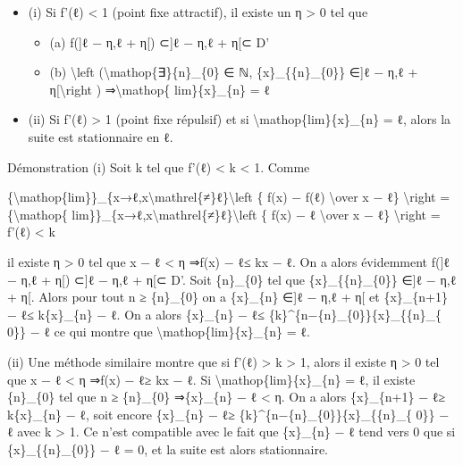 \documentclass[]{article}
\begin{document}
\begin{itemize}
\itemsep1pt\parskip0pt
\item
  (i) Si \textbar{}f'(ℓ)\textbar{} \textless{} 1 (point fixe attractif),
  il existe un η \textgreater{} 0 tel que

  \begin{itemize}
  \itemsep1pt\parskip0pt
  \item
    (a) f({]}ℓ − η,ℓ + η{[}) ⊂{]}ℓ − η,ℓ + η{[}⊂ D'
  \item
    (b) \textbackslash{}left (\textbackslash{}mathop\{∃\}\{n\}\_\{0\} ∈
    ℕ, \{x\}\_\{\{n\}\_\{0\}\} ∈{]}ℓ − η,ℓ + η{[}\textbackslash{}right )
    ⇒\textbackslash{}mathop\{ lim\}\{x\}\_\{n\} = ℓ
  \end{itemize}
\item
  (ii) Si \textbar{}f'(ℓ)\textbar{} \textgreater{} 1 (point fixe
  répulsif) et si \textbackslash{}mathop\{lim\}\{x\}\_\{n\} = ℓ, alors
  la suite est stationnaire en ℓ.
\end{itemize}

Démonstration (i) Soit k tel que \textbar{}f'(ℓ)\textbar{} \textless{} k
\textless{} 1. Comme

\{\textbackslash{}mathop\{lim\}\}\_\{x→ℓ,x\textbackslash{}mathrel\{≠\}ℓ\}\textbackslash{}left
\textbar{}\{ f(x) − f(ℓ) \textbackslash{}over x − ℓ\}
\textbackslash{}right \textbar{} =\{\textbackslash{}mathop\{
lim\}\}\_\{x→ℓ,x\textbackslash{}mathrel\{≠\}ℓ\}\textbackslash{}left
\textbar{}\{ f(x) − ℓ \textbackslash{}over x − ℓ\} \textbackslash{}right
\textbar{} = \textbar{}f'(ℓ)\textbar{} \textless{} k

il existe η \textgreater{} 0 tel que \textbar{}x − ℓ\textbar{}
\textless{} η ⇒\textbar{}f(x) − ℓ\textbar{}≤ k\textbar{}x − ℓ\textbar{}.
On a alors évidemment f({]}ℓ − η,ℓ + η{[}) ⊂{]}ℓ − η,ℓ + η{[}⊂ D'. Soit
\{n\}\_\{0\} tel que \{x\}\_\{\{n\}\_\{0\}\} ∈{]}ℓ − η,ℓ + η{[}. Alors
pour tout n ≥ \{n\}\_\{0\} on a \{x\}\_\{n\} ∈{]}ℓ − η,ℓ + η{[} et
\textbar{}\{x\}\_\{n+1\} − ℓ\textbar{}≤ k\textbar{}\{x\}\_\{n\} −
ℓ\textbar{}. On a alors \textbar{}\{x\}\_\{n\} − ℓ\textbar{}≤
\{k\}\^{}\{n−\{n\}\_\{0\}\}\textbar{}\{x\}\_\{\{n\}\_\{ 0\}\} −
ℓ\textbar{} ce qui montre que \textbackslash{}mathop\{lim\}\{x\}\_\{n\}
= ℓ.

(ii) Une méthode similaire montre que si \textbar{}f'(ℓ)\textbar{}
\textgreater{} k \textgreater{} 1, alors il existe η \textgreater{} 0
tel que \textbar{}x − ℓ\textbar{} \textless{} η ⇒\textbar{}f(x) −
ℓ\textbar{}≥ k\textbar{}x − ℓ\textbar{}. Si
\textbackslash{}mathop\{lim\}\{x\}\_\{n\} = ℓ, il existe \{n\}\_\{0\}
tel que n ≥ \{n\}\_\{0\} ⇒\textbar{}\{x\}\_\{n\} − ℓ\textbar{}
\textless{} η. On a alors \textbar{}\{x\}\_\{n+1\} − ℓ\textbar{}≥
k\textbar{}\{x\}\_\{n\} − ℓ\textbar{}, soit encore
\textbar{}\{x\}\_\{n\} − ℓ\textbar{}≥
\{k\}\^{}\{n−\{n\}\_\{0\}\}\textbar{}\{x\}\_\{\{n\}\_\{ 0\}\} −
ℓ\textbar{} avec k \textgreater{} 1. Ce n'est compatible avec le fait
que \{x\}\_\{n\} − ℓ tend vers 0 que si \{x\}\_\{\{n\}\_\{0\}\} − ℓ = 0,
et la suite est alors stationnaire.
\end{document}
